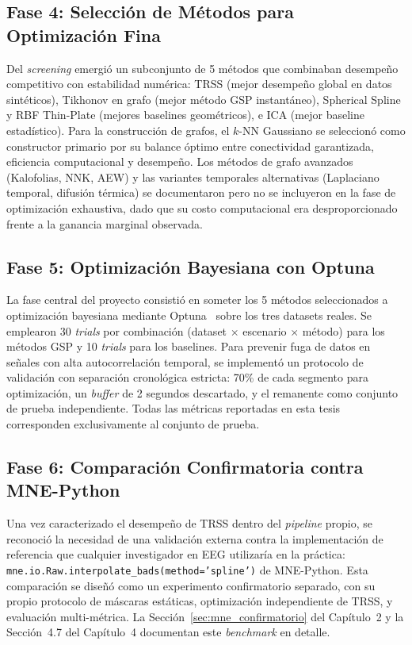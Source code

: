 \subsection{Fase 4: Selección de Métodos para Optimización Fina}

Del \textit{screening} emergió un subconjunto de 5 métodos que combinaban desempeño competitivo con estabilidad numérica: TRSS (mejor desempeño global en datos sintéticos), Tikhonov en grafo (mejor método GSP instantáneo), Spherical Spline y RBF Thin-Plate (mejores baselines geométricos), e ICA (mejor baseline estadístico). Para la construcción de grafos, el $k$-NN Gaussiano se seleccionó como constructor primario por su balance óptimo entre conectividad garantizada, eficiencia computacional y desempeño. Los métodos de grafo avanzados (Kalofolias, NNK, AEW) y las variantes temporales alternativas (Laplaciano temporal, difusión térmica) se documentaron pero no se incluyeron en la fase de optimización exhaustiva, dado que su costo computacional era desproporcionado frente a la ganancia marginal observada.

\subsection{Fase 5: Optimización Bayesiana con Optuna}

La fase central del proyecto consistió en someter los 5 métodos seleccionados a optimización bayesiana mediante Optuna~\cite{akiba2019optuna} sobre los tres datasets reales. Se emplearon 30 \textit{trials} por combinación (dataset $\times$ escenario $\times$ método) para los métodos GSP y 10 \textit{trials} para los baselines. Para prevenir fuga de datos en señales con alta autocorrelación temporal, se implementó un protocolo de validación con separación cronológica estricta: 70\% de cada segmento para optimización, un \textit{buffer} de 2 segundos descartado, y el remanente como conjunto de prueba independiente. Todas las métricas reportadas en esta tesis corresponden exclusivamente al conjunto de prueba.

\subsection{Fase 6: Comparación Confirmatoria contra MNE-Python}

Una vez caracterizado el desempeño de TRSS dentro del \textit{pipeline} propio, se reconoció la necesidad de una validación externa contra la implementación de referencia que cualquier investigador en EEG utilizaría en la práctica: \texttt{mne.io.Raw.interpolate\_bads(method='spline')} de MNE-Python. Esta comparación se diseñó como un experimento confirmatorio separado, con su propio protocolo de máscaras estáticas, optimización independiente de TRSS, y evaluación multi-métrica. La Sección~\ref{sec:mne_confirmatorio} del Capítulo~2 y la Sección~4.7 del Capítulo~4 documentan este \textit{benchmark} en detalle.

